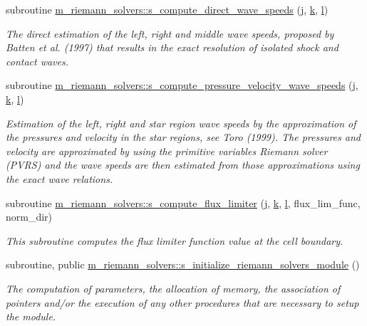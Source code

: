 \begin{DoxyCompactItemize}
subroutine \hyperlink{namespacem__riemann__solvers_a1adcb619a7800a87bf5785ca59c63233}{m\+\_\+riemann\+\_\+solvers\+::s\+\_\+compute\+\_\+direct\+\_\+wave\+\_\+speeds} (\hyperlink{m__rhs_8f90_aeadbc0ce9b66517f8fde156199772ec1}{j}, \hyperlink{m__rhs_8f90_af22c486581933c52df7d4aa306382074}{k}, \hyperlink{m__rhs_8f90_a2ac747380de0e6e5e11b01f4137fb75c}{l})
\begin{DoxyCompactList}\small\item\em The direct estimation of the left, right and middle wave speeds, proposed by Batten et al. (1997) that results in the exact resolution of isolated shock and contact waves. \end{DoxyCompactList}\item 
subroutine \hyperlink{namespacem__riemann__solvers_a107a13616d23f81b60bab83209067b01}{m\+\_\+riemann\+\_\+solvers\+::s\+\_\+compute\+\_\+pressure\+\_\+velocity\+\_\+wave\+\_\+speeds} (\hyperlink{m__rhs_8f90_aeadbc0ce9b66517f8fde156199772ec1}{j}, \hyperlink{m__rhs_8f90_af22c486581933c52df7d4aa306382074}{k}, \hyperlink{m__rhs_8f90_a2ac747380de0e6e5e11b01f4137fb75c}{l})
\begin{DoxyCompactList}\small\item\em Estimation of the left, right and star region wave speeds by the approximation of the pressures and velocity in the star regions, see Toro (1999). The pressures and velocity are approximated by using the primitive variables Riemann solver (P\+V\+RS) and the wave speeds are then estimated from those approximations using the exact wave relations. \end{DoxyCompactList}\item 
subroutine \hyperlink{namespacem__riemann__solvers_a6301a5631fda64dd97c11777807a22c9}{m\+\_\+riemann\+\_\+solvers\+::s\+\_\+compute\+\_\+flux\+\_\+limiter} (\hyperlink{m__rhs_8f90_aeadbc0ce9b66517f8fde156199772ec1}{j}, \hyperlink{m__rhs_8f90_af22c486581933c52df7d4aa306382074}{k}, \hyperlink{m__rhs_8f90_a2ac747380de0e6e5e11b01f4137fb75c}{l}, flux\+\_\+lim\+\_\+func, norm\+\_\+dir)
\begin{DoxyCompactList}\small\item\em This subroutine computes the flux limiter function value at the cell boundary. \end{DoxyCompactList}\item 
subroutine, public \hyperlink{namespacem__riemann__solvers_aab7e6bf69b7d0b8b9d911f418b872130}{m\+\_\+riemann\+\_\+solvers\+::s\+\_\+initialize\+\_\+riemann\+\_\+solvers\+\_\+module} ()
\begin{DoxyCompactList}\small\item\em The computation of parameters, the allocation of memory, the association of pointers and/or the execution of any other procedures that are necessary to setup the module. \end{DoxyCompactList}\item 

\end{DoxyCompactItemize}

